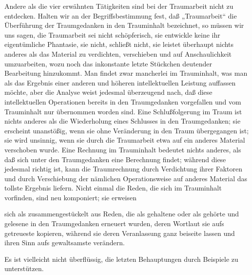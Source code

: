 \documentclass[twoside=true,titlepage=false,open=any, parskip=never, fontsize=10pt, headings=small, chapterprefix=false, appendixprefix=false]{scrbook}
\begin{document}
            
        \pstart
        Andere als die vier erwähnten Tätigkeiten sind bei der Traumarbeit
               nicht zu entdecken. Halten wir an der Begriffsbestimmung fest, daß „Traumarbeit“
               die Überführung der Traumgedanken in den Trauminhalt bezeichnet, so müssen wir
               uns sagen, die Traumarbeit sei nicht schöpferisch, sie entwickle
               keine ihr eigentümliche Phantasie, sie  nicht, schließt nicht, sie leistet überhaupt nichts anderes als das
               Material zu verdichten, verschieben und auf Anschaulichkeit umzuarbeiten, wozu
               noch das inkonstante letzte Stückchen deutender Bearbeitung hinzukommt. Man
               findet zwar mancherlei im Trauminhalt, was man als das Ergebnis einer
               anderen und höheren intellektuellen Leistung auffassen möchte, aber die Analyse
               weist jedesmal überzeugend nach, daß
               diese intellektuellen Operationen bereits in den
                  Traumgedanken vorgefallen und vom Trauminhalt nur übernommen worden sind.
               Eine Schlußfolgerung im Traum ist nichts anderes als die Wiederholung eines
               Schlusses in den Traumgedanken; sie erscheint unanstößig, wenn sie ohne
               Veränderung in den Traum übergegangen ist; sie wird unsinnig, wenn sie durch die
               Traumarbeit etwa auf ein anderes Material verschoben wurde. Eine Rechnung im
               Trauminhalt bedeutet nichts anderes, als daß sich unter den Traumgedanken eine
               Berechnung findet; während diese jedesmal richtig ist, kann die Traumrechnung durch Verdichtung ihrer Faktoren und durch Verschiebung der nämlichen Operationsweise auf anderes Material das tollste
               Ergebnis liefern. Nicht einmal die Reden, die sich im Trauminhalt vorfinden,
               sind neu komponiert; sie erweisen
        \pend
    
         
            
            
            
        \pstart
        sich als zusammengestückelt aus Reden, die als gehaltene oder als
               gehörte und gelesene in den Traumgedanken erneuert wurden, deren Wortlaut sie
               aufs getreueste kopieren, während sie deren Veranlassung ganz beiseite lassen
               und ihren Sinn aufs gewaltsamste verändern.
        \pend
    
            
        \pstart
        Es ist vielleicht nicht überflüssig, die letzten Behauptungen durch Beispiele zu
               unterstützen.
        \pend
    
\end{document}
